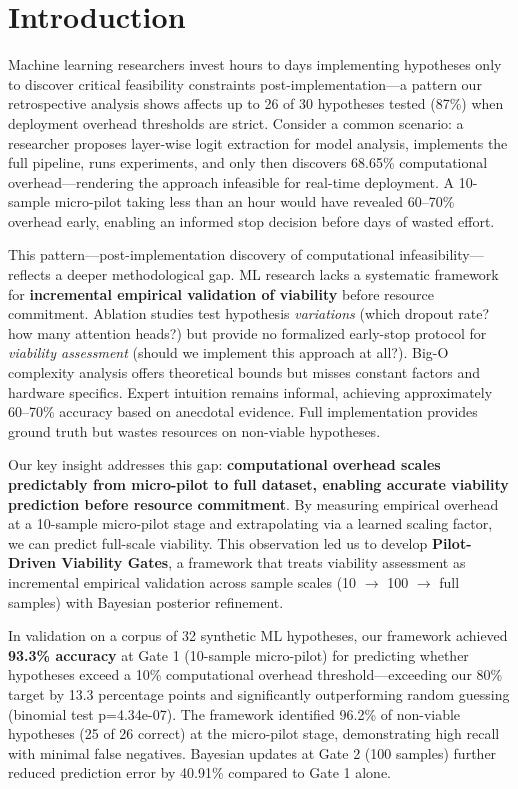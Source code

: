 \section{Introduction}

Machine learning researchers invest hours to days implementing hypotheses only to discover critical feasibility constraints post-implementation---a pattern our retrospective analysis shows affects up to 26 of 30 hypotheses tested (87\%) when deployment overhead thresholds are strict. Consider a common scenario: a researcher proposes layer-wise logit extraction for model analysis, implements the full pipeline, runs experiments, and only then discovers 68.65\% computational overhead---rendering the approach infeasible for real-time deployment. A 10-sample micro-pilot taking less than an hour would have revealed 60--70\% overhead early, enabling an informed stop decision before days of wasted effort.

This pattern---post-implementation discovery of computational infeasibility---reflects a deeper methodological gap. ML research lacks a systematic framework for \textbf{incremental empirical validation of viability} before resource commitment. Ablation studies test hypothesis \textit{variations} (which dropout rate? how many attention heads?) but provide no formalized early-stop protocol for \textit{viability assessment} (should we implement this approach at all?). Big-O complexity analysis offers theoretical bounds but misses constant factors and hardware specifics. Expert intuition remains informal, achieving approximately 60--70\% accuracy based on anecdotal evidence. Full implementation provides ground truth but wastes resources on non-viable hypotheses.

Our key insight addresses this gap: \textbf{computational overhead scales predictably from micro-pilot to full dataset, enabling accurate viability prediction before resource commitment}. By measuring empirical overhead at a 10-sample micro-pilot stage and extrapolating via a learned scaling factor, we can predict full-scale viability. This observation led us to develop \textbf{Pilot-Driven Viability Gates}, a framework that treats viability assessment as incremental empirical validation across sample scales (10 $\rightarrow$ 100 $\rightarrow$ full samples) with Bayesian posterior refinement.

In validation on a corpus of 32 synthetic ML hypotheses, our framework achieved \textbf{93.3\% accuracy} at Gate 1 (10-sample micro-pilot) for predicting whether hypotheses exceed a 10\% computational overhead threshold---exceeding our 80\% target by 13.3 percentage points and significantly outperforming random guessing (binomial test p=4.34e-07). The framework identified 96.2\% of non-viable hypotheses (25 of 26 correct) at the micro-pilot stage, demonstrating high recall with minimal false negatives. Bayesian updates at Gate 2 (100 samples) further reduced prediction error by 40.91\% compared to Gate 1 alone.

